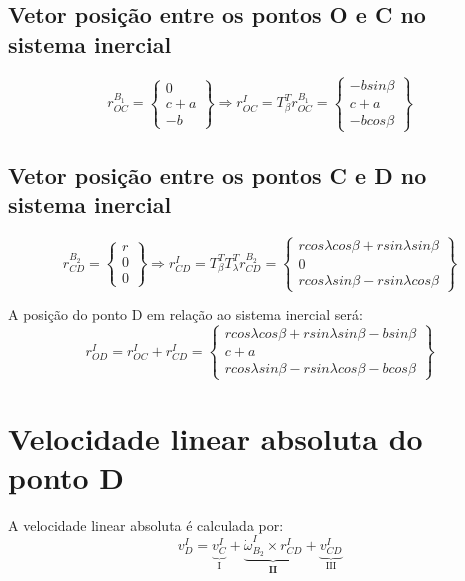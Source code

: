 \documentclass[a4paper, 12pt]{article}
\begin{document}
	\subsection{Vetor posição entre os pontos O e C no sistema inercial}
		\begin{equation}
			r^{B_1}_{OC} = \begin{Bmatrix}
			0\\
			c + a\\
			-b 
			\end{Bmatrix}
			\Rightarrow
			r^I_{OC} = T_\beta^T r^{B_1}_{OC} = 
			\begin{Bmatrix}
				-bsin\beta\\
				c+a\\
				-bcos\beta
			\end{Bmatrix}
		\end{equation}

	\subsection{Vetor posição entre os pontos C e D no sistema inercial}
		\begin{equation}
			r^{B_2}_{CD} = \begin{Bmatrix}
				r\\
				0\\
				0
			\end{Bmatrix}\Rightarrow 
			r^I_{CD} = T^T_\beta T^T_\lambda r^{B_2}_{CD} = \begin{Bmatrix}
				rcos\lambda cos\beta + rsin \lambda sin \beta\\
				0\\
				r cos \lambda sin \beta - rsin\lambda cos \beta
			\end{Bmatrix}
		\end{equation}

		A posição do ponto D em relação ao sistema inercial será:
		\begin{equation}
			r^I_{OD} = r^I_{OC} + r^I_{CD} = \begin{Bmatrix}
				rcos\lambda cos\beta + rsin \lambda sin \beta -bsin\beta \\
				c+a\\
				r cos \lambda sin \beta - rsin\lambda cos \beta -bcos\beta
			\end{Bmatrix}
		\end{equation}

\section{Velocidade linear absoluta do ponto D}
	A velocidade linear absoluta é calculada por:
	\begin{equation}
		v_D^I = \underbrace{v_C^I}_\text{I} + \underbrace{\dot{\omega}^I_{B_2} \times r^I_{CD}}_\textbf{II} + \underbrace{v^I_{CD}}_\text{III}
 	\end{equation}
	
\end{document}
